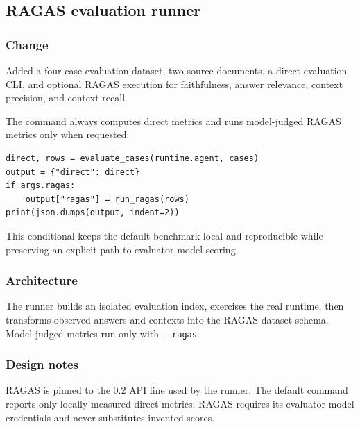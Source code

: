 
\subsection{RAGAS evaluation runner}


\subsubsection{Change}

Added a four-case evaluation dataset, two source documents, a direct evaluation CLI, and optional RAGAS execution for faithfulness, answer relevance, context precision, and context recall.

The command always computes direct metrics and runs model-judged RAGAS metrics only when requested:

\begin{verbatim}
direct, rows = evaluate_cases(runtime.agent, cases)
output = {"direct": direct}
if args.ragas:
    output["ragas"] = run_ragas(rows)
print(json.dumps(output, indent=2))
\end{verbatim}

This conditional keeps the default benchmark local and reproducible while preserving an explicit path to evaluator-model scoring.

\subsubsection{Architecture}

The runner builds an isolated evaluation index, exercises the real runtime, then transforms observed answers and contexts into the RAGAS dataset schema. Model-judged metrics run only with \texttt{-\/-ragas}.

\subsubsection{Design notes}

RAGAS is pinned to the 0.2 API line used by the runner. The default command reports only locally measured direct metrics; RAGAS requires its evaluator model credentials and never substitutes invented scores.

